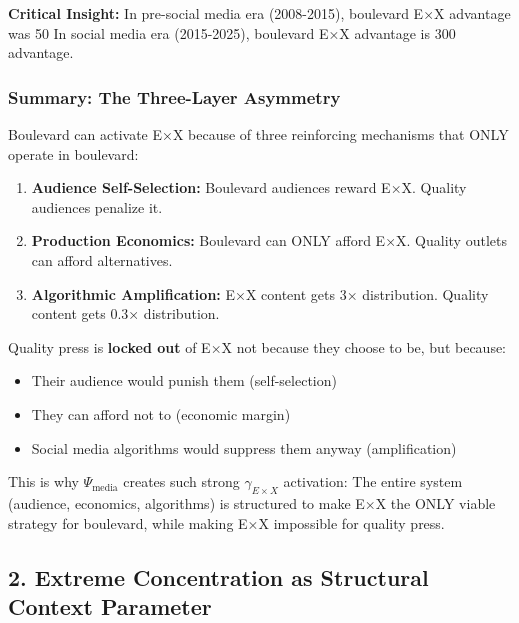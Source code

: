 \textbf{Critical Insight:} In pre-social media era (2008-2015), boulevard E×X advantage was 50%
In social media era (2015-2025), boulevard E×X advantage is 300%
advantage.

\subsubsection*{Summary: The Three-Layer Asymmetry}

Boulevard can activate E×X because of three reinforcing mechanisms that ONLY operate in boulevard:

\begin{enumerate}
\item \textbf{Audience Self-Selection:} Boulevard audiences reward E×X. Quality audiences penalize it.
\item \textbf{Production Economics:} Boulevard can ONLY afford E×X. Quality outlets can afford alternatives.
\item \textbf{Algorithmic Amplification:} E×X content gets 3× distribution. Quality content gets 0.3× distribution.
\end{enumerate}

Quality press is \textbf{locked out} of E×X not because they choose to be, but because:
\begin{itemize}
\item Their audience would punish them (self-selection)
\item They can afford not to (economic margin)
\item Social media algorithms would suppress them anyway (amplification)
\end{itemize}

This is why $\Psi_{\text{media}}$ creates such strong $\gamma_{E \times X}$ activation: The entire
system (audience, economics, algorithms) is structured to make E×X the ONLY viable strategy for
boulevard, while making E×X impossible for quality press.

\label{sec:dx-media-structure}

\subsection*{2. Extreme Concentration as Structural Context Parameter}

